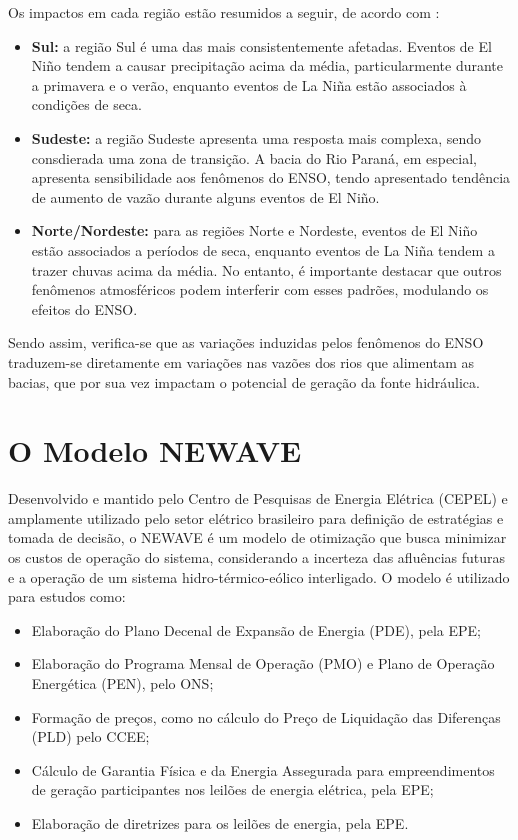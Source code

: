 Os impactos em cada região estão resumidos a seguir, de acordo com :
\begin{itemize}
	\item \textbf{Sul:} a região Sul é uma das mais consistentemente afetadas. Eventos de El Niño tendem a causar precipitação 
acima da média, particularmente durante a primavera e o verão, enquanto eventos de La Niña estão associados à condições de seca.
	\item \textbf{Sudeste:} a região Sudeste apresenta uma resposta mais complexa, sendo consdierada uma zona de transição. 
A bacia do Rio Paraná, em especial, apresenta sensibilidade aos fenômenos do ENSO, tendo apresentado tendência de aumento de 
vazão durante alguns eventos de El Niño.
	\item \textbf{Norte/Nordeste:} para as regiões Norte e Nordeste, eventos de El Niño estão associados a períodos de seca, enquanto eventos de
La Niña tendem a trazer chuvas acima da média. No entanto, é importante destacar que outros fenômenos atmosféricos podem
interferir com esses padrões, modulando os efeitos do ENSO.
\end{itemize}

Sendo assim, verifica-se que as variações induzidas pelos fenômenos do ENSO traduzem-se diretamente em variações nas
vazões dos rios que alimentam as bacias, que por sua vez impactam o potencial de geração da fonte hidráulica.


\section{O Modelo NEWAVE}
\label{sec:newave}

Desenvolvido e mantido pelo Centro de Pesquisas de Energia Elétrica (CEPEL) e amplamente utilizado pelo setor elétrico 
brasileiro para definição de estratégias e tomada de decisão, o NEWAVE é um modelo de otimização que busca minimizar os 
custos de operação do sistema, considerando a incerteza das afluências futuras e a operação de um sistema 
hidro-térmico-eólico interligado. O modelo é utilizado para estudos como:
\begin{itemize}
	\item Elaboração do Plano Decenal de Expansão de Energia (PDE), pela EPE;
	\item Elaboração do Programa Mensal de Operação (PMO) e Plano de Operação Energética (PEN), pelo ONS;
	\item Formação de preços, como no cálculo do Preço de Liquidação das Diferenças (PLD) pelo CCEE;
	\item Cálculo de Garantia Física e da Energia Assegurada para empreendimentos de geração participantes nos leilões 
    de energia elétrica, pela EPE;
	\item Elaboração de diretrizes para os leilões de energia, pela EPE.
\end{itemize}

